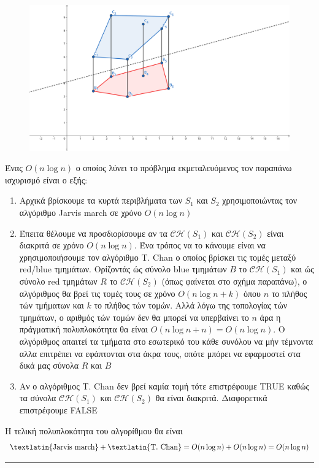 \documentclass[12pt]{article}
\begin{document}
\begin{figure}[H]

    \centering
    \includegraphics[scale = 0.85]{GE6.png}\\ 
\end{figure} 
Ένας $O(n\log n)$ ο οποίος λύνει το πρόβλημα εκμεταλευόμενος τον παραπάνω ισχυρισμό είναι ο εξής:
\begin{enumerate}
    \item  Αρχικά βρίσκουμε τα κυρτά περιβλήματα των $S_1$ και $S_2$ χρησιμοποιώντας τον αλγόριθμο \textlatin{Jarvis march} σε χρόνο $O(n\log n)$ 
    \item Έπειτα θέλουμε να προσδιορίσουμε αν τα $\mathcal{CH}(S_1)$ και $\mathcal{CH}(S_2)$ είναι διακριτά σε χρόνο $O(n\log n)$. Ένα τρόπος να το κάνουμε είναι να χρησιμοποιήσουμε τον αλγόριθμο 
            \textlatin{T. Chan} ο οποίος βρίσκει τις τομές μεταξύ \textlatin{red/blue} τμημάτων. Ορίζοντάς ώς σύνολο \textlatin{blue} τμημάτων $B$ το $\mathcal{CH}(S_1)$ και ώς σύνολο \textlatin{red} τμημάτων $R$ το $\mathcal{CH}(S_2)$ (όπως φαίνεται στο σχήμα παραπάνω),
            ο αλγόριθμος θα βρεί τις τομές τους σε χρόνο $O(n\log n +k)$ όπου $n$ το πλήθος τών τμήματων και $k$ το πλήθος τών τομών. Αλλά λόγω της τοπολογίας τών τμημάτων, ο αριθμός τών τομών δεν θα μπορεί να υπερβαίνει το $n$ άρα η πράγματική πολυπλοκότητα θα είναι $Ο(n\log n + n) = O(n\log n)$. Ο 
            αλγόριθμος απαιτεί τα τμήματα στο εσωτερικό του κάθε συνόλου να μήν τέμνοντα αλλα επιτρέπει να εφάπτονται στα άκρα τους, οπότε μπόρει να εφαρμοστεί στα δικά μας σύνολα $R$  και $B$
    \item Αν ο αλγόριθμος \textlatin{T. Chan} δεν βρεί καμία τομή τότε επιστρέφουμε \textlatin{TRUE} καθώς τα σύνολα $\mathcal{CH}(S_1)$ και $\mathcal{CH}(S_2)$ θα είναι διακριτά. Διαφορετικά επιστρέφουμε \textlatin{FALSE}
        \end{enumerate}
    Η τελική πολυπλοκότητα του αλγορίθμου θα είναι 
    $$ \textnormal{\textlatin{Jarvis march}} + \textnormal{\textlatin{T. Chan}} = O(n\log n) + O(n \log n) = O(n\log n)$$
\rule{\textwidth}{.5pt}
\end{document}
